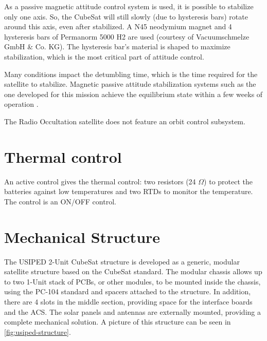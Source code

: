 As a passive magnetic attitude control system is used, it is possible to stabilize only one axis. So, the CubeSat will still slowly (due to hysteresis bars) rotate around this axis, even after stabilized. A N45 neodymium magnet and 4 hysteresis bars of Permanorm 5000 H2 are used (courtesy of Vacuumschmelze GmbH \& Co. KG). The hysteresis bar's material is shaped to maximize stabilization, which is the most critical part of attitude control.

Many conditions impact the detumbling time, which is the time required for the satellite to stabilize. Magnetic passive attitude stabilization systems such as the one developed for this mission achieve the equilibrium state within a few weeks of operation \cite{santoni2009}.

The Radio Occultation satellite does not feature an orbit control subsystem.

\section{Thermal control}

An active control gives the thermal control: two resistors (24 $\Omega$) to protect the batteries against low temperatures and two RTDs to monitor the temperature. The control is an ON/OFF control.



\section{Mechanical Structure}

The USIPED 2-Unit CubeSat structure is developed as a generic, modular satellite structure based on the CubeSat standard. The modular chassis allows up to two 1-Unit stack of PCBs, or other modules, to be mounted inside the chassis, using the PC-104 standard and spacers attached to the structure. In addition, there are 4 slots in the middle section, providing space for the interface boards and the ACS. The solar panels and antennas are externally mounted, providing a complete mechanical solution. A picture of this structure can be seen in \autoref{fig:usiped-structure}.

